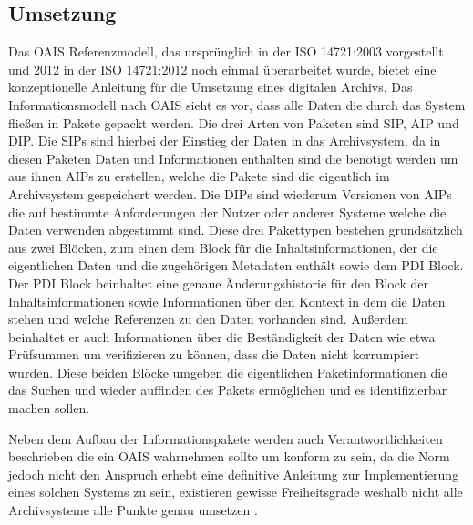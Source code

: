 \documentclass[conference,compsoc,final,a4paper]{IEEEtran}
\begin{document}
\subsection{Umsetzung}
Das \ac{OAIS} Referenzmodell, das ursprünglich in der ISO 14721:2003 vorgestellt und 2012 in der ISO 14721:2012 noch einmal überarbeitet wurde, bietet eine konzeptionelle Anleitung für die Umsetzung eines digitalen Archivs. Das Informationsmodell nach \ac{OAIS} sieht es vor, dass alle Daten die durch das System fließen in Pakete gepackt werden. Die drei Arten von Paketen sind \ac{SIP}, \ac{AIP} und \ac{DIP}. Die \ac{SIP}s sind hierbei der Einstieg der Daten in das Archivsystem, da in diesen Paketen Daten und Informationen enthalten sind die benötigt werden um aus ihnen \ac{AIP}s zu erstellen, welche die Pakete sind die eigentlich im Archivsystem gespeichert werden. Die \ac{DIP}s sind wiederum Versionen von \ac{AIP}s die auf bestimmte Anforderungen der Nutzer oder anderer Systeme welche die Daten verwenden abgestimmt sind. Diese drei Pakettypen bestehen grundsätzlich aus zwei Blöcken, zum einen dem Block für die Inhaltsinformationen, der die eigentlichen Daten und die zugehörigen Metadaten enthält sowie dem \ac{PDI} Block. Der \ac{PDI} Block beinhaltet eine genaue Änderungshistorie für den Block der Inhaltsinformationen sowie Informationen über den Kontext in dem die Daten stehen und welche Referenzen zu den Daten vorhanden sind. Außerdem beinhaltet er auch Informationen über die Beständigkeit der Daten wie etwa Prüfsummen um verifizieren zu können, dass die Daten nicht korrumpiert wurden. Diese beiden Blöcke umgeben die eigentlichen Paketinformationen die das Suchen und wieder auffinden des Pakets ermöglichen und es identifizierbar machen sollen.

Neben dem Aufbau der Informationspakete werden auch Verantwortlichkeiten beschrieben die ein \ac{OAIS} wahrnehmen sollte um konform zu sein, da die Norm jedoch nicht den Anspruch erhebt eine definitive Anleitung zur Implementierung eines solchen Systems zu sein, existieren gewisse Freiheitsgrade weshalb nicht alle Archivsysteme alle Punkte genau umsetzen \autocite{Ball2006}.

\end{document}
